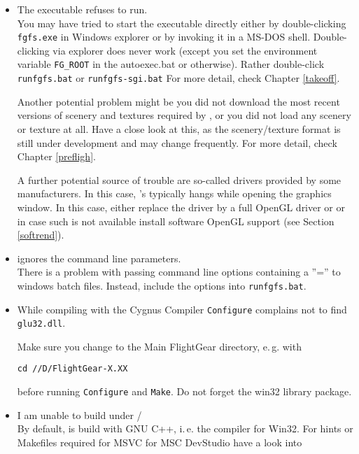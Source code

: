 \begin{itemize}
\item{The executable refuses to run.}\\
 You may have tried to start the executable directly either by
 double-clicking \texttt{fgfs.exe} in Windows explorer or by invoking it
 in a MS-DOS shell. Double-clicking via explorer does never work
 (except you set the environment variable \texttt{FG\_ROOT}
 in the autoexec.bat or otherwise). Rather double-click \texttt{runfgfs.bat} or
 \texttt{runfgfs-sgi.bat}  For more detail, check Chapter \ref{takeoff}.

 Another potential problem might be you did not download the
 most recent versions of scenery and textures required by \FlightGear, or
 you did not load any scenery or texture at all. Have a close look
 at this, as the scenery/texture format is still under development and may
 change frequently. For more detail, check Chapter \ref{prefligh}.

 A further potential source of trouble are so-called
  drivers provided by some manufacturers. In this case,
 {\FlightGear}'s typically hangs while opening the graphics window.
 In this case, either replace the  driver by a
 full OpenGL driver or or in case such is not available install
 software OpenGL support (see Section \ref{softrend}).

\item{\FlightGear ignores the command line parameters.}\\
 There is a problem with passing command line options containing a
 ''='' to windows batch files. Instead, include the options into
 \texttt{runfgfs.bat}.

\item{While compiling with the Cygnus Compiler \texttt{Configure}
complains not to find \texttt{glu32.dll}}.

Make sure you change to the Main FlightGear directory, e.\,g. with

\texttt{cd //D/FlightGear-X.XX}

before running \texttt{Configure} and \texttt{Make}. Do not forget the win32 library
package.

\item{I am unable to build \FlightGear under /}\\
 By default, \FlightGear is build with GNU C++, i.\,e. the
  compiler for Win32. For hints or Makefiles
 required for MSVC for MSC DevStudio have a look into


\end{itemize}
